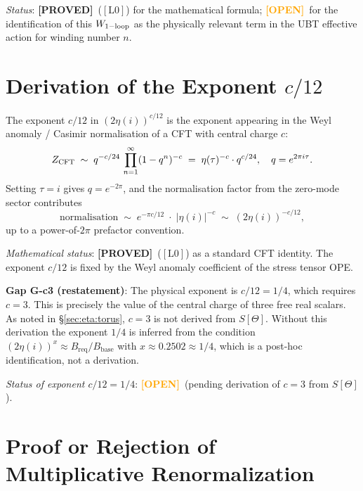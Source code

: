 \documentclass[12pt,a4paper]{article}
\theoremstyle{definition}
\theoremstyle{remark}
\newcommand{\PROVED}{\textcolor{green!60!black}{\textbf{[PROVED]}}}
\newcommand{\OPEN}{\textcolor{orange}{\textbf{[OPEN]}}}
\newcommand{\Lzero}{$[\mathrm{L0}]$}
\newcommand{\Bbase}{B_{\mathrm{base}}}
\newcommand{\Breq}{B_{\mathrm{req}}}
\begin{document}
\noindent\textit{Status}: \PROVED\ (\Lzero) for the mathematical formula;
\OPEN\ for the identification of this $W_{\rm 1-loop}$ as the physically
relevant term in the UBT effective action for winding number $n$.

\section{Derivation of the Exponent $c/12$}
\label{sec:eta:exponent}

The exponent $c/12$ in $(2\eta(i))^{c/12}$ is the exponent appearing in
the Weyl anomaly / Casimir normalisation of a CFT with central charge $c$:
\begin{equation}\label{eq:weyl_anomaly}
  Z_{\rm CFT} \;\sim\; q^{-c/24}\,\prod_{n=1}^\infty (1-q^n)^{-c}
  \;=\; \eta(\tau)^{-c}\cdot q^{c/24},
  \quad q = e^{2\pi i\tau}.
\end{equation}
Setting $\tau = i$ gives $q = e^{-2\pi}$, and the normalisation factor
from the zero-mode sector contributes
\begin{equation}\label{eq:normalisation_factor}
  \text{normalisation} \;\sim\; e^{-\pi c/12} \;\cdot\; |\eta(i)|^{-c}
  \;\sim\; (2\eta(i))^{-c/12},
\end{equation}
up to a power-of-$2\pi$ prefactor convention.

\noindent\textit{Mathematical status}: \PROVED\ (\Lzero) as a standard CFT
identity.  The exponent $c/12$ is fixed by the Weyl anomaly coefficient of
the stress tensor OPE.

\begin{gapbox}
\textbf{Gap G-c3 (restatement)}: The physical exponent is $c/12 = 1/4$,
which requires $c = 3$.  This is precisely the value of the central charge
of three free real scalars.  As noted in §\ref{sec:eta:torus}, $c = 3$ is
not derived from $S[\Theta]$.  Without this derivation the exponent $1/4$
is inferred from the condition $(2\eta(i))^x \approx \Breq/\Bbase$ with
$x \approx 0.2502 \approx 1/4$, which is a post-hoc identification, not a
derivation.
\end{gapbox}

\noindent\textit{Status of exponent $c/12 = 1/4$}: \OPEN\ (pending
derivation of $c = 3$ from $S[\Theta]$).

\section{Proof or Rejection of Multiplicative Renormalization}
\label{sec:eta:proof_rejection}
\end{document}
